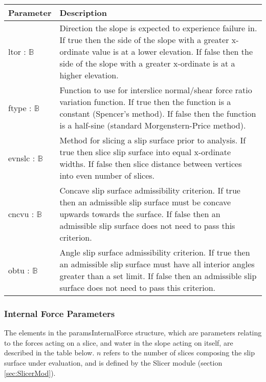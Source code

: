 \documentclass[12pt, titlepage]{article}
\begin{document}
\begin{center}
\begin{longtable}{ p{} 
    p{}}\hline 

  \textbf{Parameter} & \textbf{Description}\\ \hline

  ltor : $\mathbb{B}$ & Direction the slope is expected to
  experience failure in. If true then the side of the slope with a
  greater x-ordinate value is at a lower elevation. If false then the
  side of the slope with a greater x-ordinate is at a higher
  elevation.\\

  ftype : $\mathbb{B}$ & Function to use for interslice normal/shear force 
  ratio variation function. If true then the function is a constant (Spencer's 
  method). If false then the function is a half-sine (standard 
  Morgenstern-Price method). \\

  evnslc : $\mathbb{B}$ & Method for slicing a slip surface prior to analysis. 
  If true then slice slip surface into equal x-ordinate widths. If false then 
  slice distance between vertices into even number of slices. \\

  cncvu : $\mathbb{B}$ & Concave slip surface admissibility
  criterion. If true then an admissible slip surface must be concave
  upwards towards the surface. If false then an admissible slip
  surface does not need to pass this criterion.\\

  obtu : $\mathbb{B}$ & Angle slip surface
  admissibility criterion. If true then an admissible slip surface
  must have all interior angles greater than a set limit. If false
  then an admissible slip surface does not need to pass this
  criterion.\\ \hline
\end{longtable}
\end{center}

\subsubsection{Internal Force Parameters} \label{Tbl:ForceParam}
\noindent
The elements in the paramsInternalForce structure, which are parameters 
relating to the forces acting on a slice, and water in the slope acting
on itself, are described in the table below. $n$ refers to the number of slices 
composing the slip surface under evaluation, and is defined by the Slicer 
module (section \ref{sec:SlicerMod}).
\end{document}
